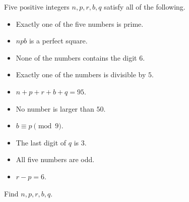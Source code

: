 Five positive integers $n,p,r,b,q$ satisfy all of the following.
\begin{itemize}
\item Exactly one of the five numbers is prime.
\item $npb$ is a perfect square.
\item None of the numbers contains the digit $6$.
\item Exactly one of the numbers is divisible by $5$.
\item $n+p+r+b+q=95$.
\item No number is larger than $50$.
\item $b\equiv p\pmod 9$.
\item The last digit of $q$ is $3$.
\item All five numbers are odd.
\item $r-p=6$.
\end{itemize}
Find $n,p,r,b,q$.
